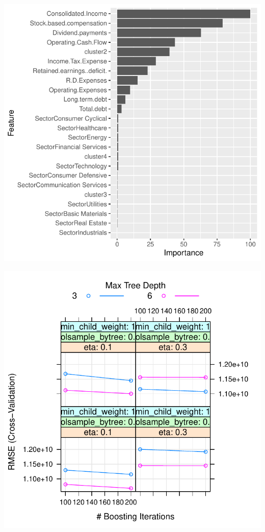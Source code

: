 \documentclass[11pt,]{article}
\begin{document}
\begin{center}\includegraphics{stock_analysis_files/figure-latex/XGBoost-1} \end{center}

\begin{center}\includegraphics{stock_analysis_files/figure-latex/XGBoost-2} \end{center}
\end{document}
